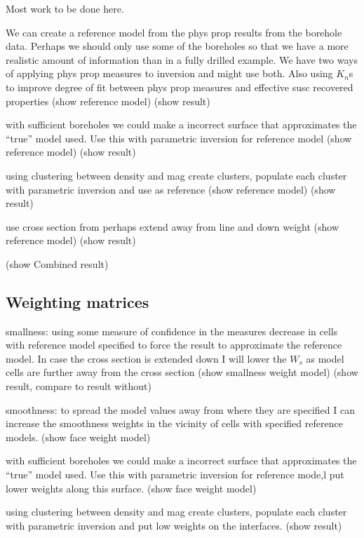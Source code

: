 Most work to be done here. 

We can create a reference model from the phys prop results from the borehole data. Perhaps we should only use some of the boreholes so that we have a more realistic amount of information than in a fully drilled example. We have two ways of applying phys prop measures to inversion and might use both. Also using $K_n$s to improve degree of fit between phys prop measures and effective susc recovered properties
(show reference model)
(show result)

with sufficient boreholes we could make a incorrect surface that approximates the ``true'' model used. Use this with parametric inversion for reference model
(show reference model)
(show result)

using clustering between density and mag create clusters, populate each cluster with parametric inversion and use as reference
(show reference model)
(show result)

use cross section from \cite{harder2006geologyTKC}
perhaps extend away from line and down weight
(show reference model)
(show result)

(show Combined result)

\subsection{Weighting matrices}
\label{sec:Weighting matrices:TKC}

smallness: using some measure of confidence in the measures decrease in cells with reference model specified to force the result to approximate the reference model. In case the cross section is extended down I will lower the $W_s$ as model cells are further away from the cross section
(show smallness weight model)
(show result, compare to result without)


smoothness: to spread the model values away from where they are specified I can increase the smoothness weights in the vicinity of cells with specified reference models. 
(show face weight model)

with sufficient boreholes we could make a incorrect surface that approximates the ``true'' model used. Use this with parametric inversion for reference mode,l put lower weights along this surface.
(show face weight model)

using clustering between density and mag create clusters, populate each cluster with parametric inversion and put low weights on the interfaces.
(show result)


